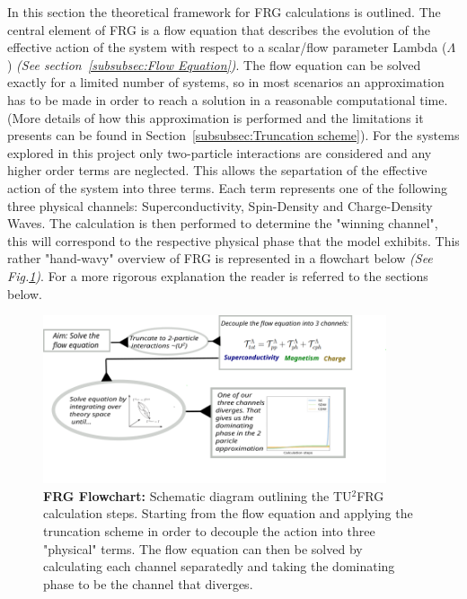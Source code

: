 \documentclass[12pt]{article}
\begin{document}
\medskip

\noindent In this section the theoretical framework for FRG calculations is outlined. The central element of FRG is a flow equation that describes the evolution of the effective action of the system with respect to a scalar/flow parameter Lambda ($\Lambda$) \textit{(See section~\ref{subsubsec:Flow Equation})}.
The flow equation can be solved exactly for a limited number of systems, so in most scenarios an approximation has to be made in order to reach a solution in a reasonable computational time. 
(More details of how this approximation is performed and the limitations it presents can be found in Section~\ref{subsubsec:Truncation scheme}). 
For the systems explored in this project only two-particle
interactions are considered and any higher order terms are neglected.
This allows the separtation of the effective action of the system into three terms. Each term represents one of the following three physical channels: Superconductivity, Spin-Density and Charge-Density Waves.
The calculation is then performed to determine the "winning channel", this will correspond to the respective physical phase that the model exhibits. This rather "hand-wavy" overview of FRG is represented in a flowchart below \textit{(See Fig.\ref{fig:FRGflowdiagram})}.
For a more rigorous explanation the reader is referred to the sections below. 

\begin{figure}[htbp]  %
    \centering
    \includegraphics[width=0.9\textwidth]{FRGflowdiagram.png}  %
    \caption{\textbf{FRG Flowchart:} Schematic diagram outlining the TU$^2$FRG calculation steps. Starting from the flow equation and applying the truncation scheme in order to decouple the action into three "physical" terms. 
    The flow equation can then be solved by calculating each channel separatedly and taking the dominating phase to be the channel that diverges.}
    \label{fig:FRGflowdiagram}
\end{figure}
\end{document}
